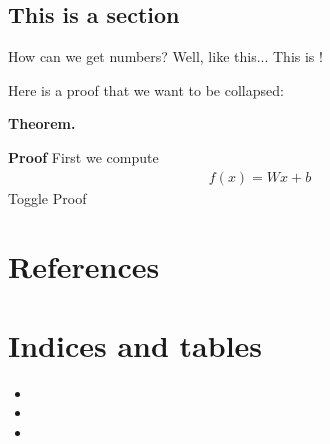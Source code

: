 \documentclass[letterpaper,10pt,english]{sphinxmanual}
\begin{document}
\section{This is a section}
\label{test/Test_reST:sec-thisone}\label{test/Test_reST:this-is-a-section}
How can we get numbers? Well, like this...
This is {\hyperref[test/Test_reST:sec\string-thisone]{}}!

Here is a proof that we want to be collapsed:

\textbf{Theorem.}

\textbf{Proof} First we compute
\label{test/Test_reST:equation-test2}\begin{equation}\label{test/Test_reST-test2}
\begin{split}f(x) = W x + b\end{split}
\end{equation}
Toggle Proof


\chapter{References}
\label{test/Test_reST:references}

\chapter{Indices and tables}
\label{index:indices-and-tables}\begin{itemize}
\item {} 

\item {} 

\item {} 

\end{itemize}
\end{document}
